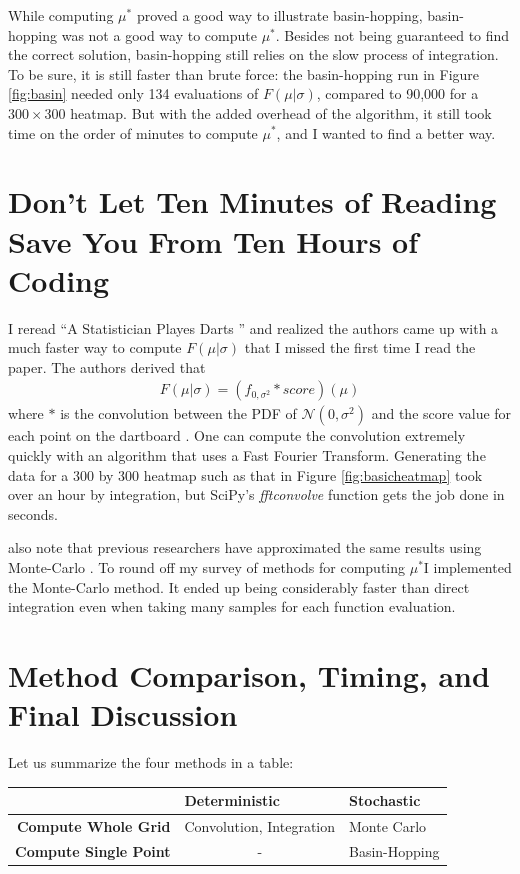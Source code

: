 \documentclass[]{article}
\newcommand{\mustar}{\ensuremath{\mu^* }}
\begin{document}
While computing $\mu^*$ proved a good way to illustrate basin-hopping, basin-hopping was not a good way to compute $\mu^*$. Besides not being guaranteed to find the correct solution, basin-hopping still relies on the slow process of integration. To be sure, it is still faster than brute force: the basin-hopping run in Figure \ref{fig:basin} needed only 134 evaluations of $F(\mu \vert \sigma)$, compared to 90,000 for a $300 \times 300$ heatmap. But with the added overhead of the algorithm, it still took time on the order of minutes to compute $\mu^*$, and I wanted to find a better way.

\section{Don't Let Ten Minutes of Reading Save You From Ten Hours of Coding}
I reread ``A Statistician Playes Darts \cite{stat}'' and realized the authors came up with a much faster way to compute $F(\mu \vert \sigma)$ that I missed the first time I read the paper. The authors derived that
\begin{align}
	F(\mu \vert \sigma)  =(f_{0, \sigma^2} * score)(\mu)
\end{align}
 where $*$ is the convolution between the PDF of $\mathcal{N}(0, \sigma^2)$ and the score value for each point on the dartboard \cite{stat}. One can compute the convolution extremely quickly with an algorithm that uses a Fast Fourier Transform. Generating the data for a 300 by 300 heatmap such as that in Figure \ref{fig:basicheatmap} took over an hour by integration, but SciPy's \textit{fftconvolve} function gets the job done in seconds. 

\citeauthor{stat} also note that previous researchers have approximated the same results using Monte-Carlo \cite{stat}. To round off my  survey of methods for computing \mustar I implemented the Monte-Carlo method. It ended up being considerably faster than direct integration even when taking many samples for each function evaluation. 

\section{Method Comparison, Timing, and Final Discussion}\label{sec:timing}

Let us summarize the four methods in a table:

\begin{table}[h]
	\centering
	\begin{tabular}{r  l l}
		& \textbf{Deterministic} & \textbf{Stochastic} \\ \hline
		\textbf{Compute Whole Grid} \vline& Convolution, Integration & Monte Carlo \\
		\textbf{Compute Single Point} \vline& \multicolumn{1}{c}{-} & Basin-Hopping
	\end{tabular}
\end{table}
\end{document}
